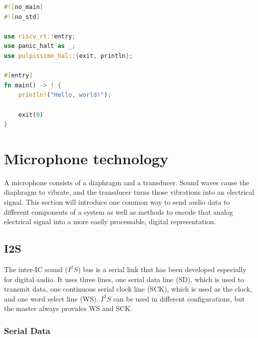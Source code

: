 \newpage

\begin{minipage}{\textwidth}
\begin{lstlisting}[style=colorEX,language=Rust,caption={Minimal example of a program running on the pulpissimo hardware},label={code:min_example}]
#![no_main]
#![no_std]

use riscv_rt::entry;
use panic_halt as _;
use pulpissimo_hal::{exit, println};

#[entry]
fn main() -> ! {
    println!("Hello, world!");

    exit(0)
}
\end{lstlisting}
\end{minipage}


\section{Microphone technology}

A microphone consists of a diaphragm and a transducer.
Sound waves cause the diaphragm to vibrate, and
the transducer turns those vibrations into an electrical signal.
This section will introduce one common way to send audio data to different
components of a system as well as methods to encode that analog electrical
signal into a more easily processable, digital representation.

\subsection{I2S}

The inter-IC sound ($I^2S$) \cite{i2s} bus is a serial link that has been developed especially for digital audio.
It uses three lines, one serial data line (SD), which is used to transmit data, one continuous serial clock line (SCK),
which is used as the clock, and one word select line (WS).
$I^2S$ can be used in different configurations, but the master always provides WS and SCK.

\subsubsection{Serial Data}

